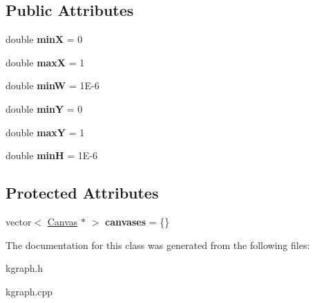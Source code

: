 \subsection*{Public Attributes}
\begin{DoxyCompactItemize}
\item 
\hypertarget{class_k_graph_1_1_picture_a592b43c93b78d2a5da567275becda80c}{double {\bfseries min\-X} = 0}\label{class_k_graph_1_1_picture_a592b43c93b78d2a5da567275becda80c}

\item 
\hypertarget{class_k_graph_1_1_picture_a4fcdf6e5ba87e59c41d4f5998a3eb2fd}{double {\bfseries max\-X} = 1}\label{class_k_graph_1_1_picture_a4fcdf6e5ba87e59c41d4f5998a3eb2fd}

\item 
\hypertarget{class_k_graph_1_1_picture_a22212d24cf564764d48bfbedab8a2db8}{double {\bfseries min\-W} = 1\-E-\/6}\label{class_k_graph_1_1_picture_a22212d24cf564764d48bfbedab8a2db8}

\item 
\hypertarget{class_k_graph_1_1_picture_adb02963e33c857b45f888cdc8f32359b}{double {\bfseries min\-Y} = 0}\label{class_k_graph_1_1_picture_adb02963e33c857b45f888cdc8f32359b}

\item 
\hypertarget{class_k_graph_1_1_picture_a3f559368c3b1e46bd827e45122a2aa94}{double {\bfseries max\-Y} = 1}\label{class_k_graph_1_1_picture_a3f559368c3b1e46bd827e45122a2aa94}

\item 
\hypertarget{class_k_graph_1_1_picture_a55f1e17679bfbf74fcb70eebdf2fb962}{double {\bfseries min\-H} = 1\-E-\/6}\label{class_k_graph_1_1_picture_a55f1e17679bfbf74fcb70eebdf2fb962}

\end{DoxyCompactItemize}
\subsection*{Protected Attributes}
\begin{DoxyCompactItemize}
\item 
\hypertarget{class_k_graph_1_1_picture_a1feeffcd79f68000918a66972dcfe9e9}{vector$<$ \hyperlink{class_k_graph_1_1_canvas}{Canvas} $\ast$ $>$ {\bfseries canvases} = \{\}}\label{class_k_graph_1_1_picture_a1feeffcd79f68000918a66972dcfe9e9}

\end{DoxyCompactItemize}


The documentation for this class was generated from the following files\-:\begin{DoxyCompactItemize}
\item 
kgraph.\-h\item 
kgraph.\-cpp\end{DoxyCompactItemize}
